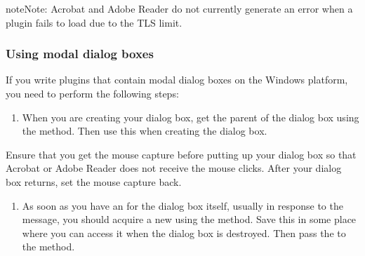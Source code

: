 \documentclass[letterpaper,12pt,english,openany,oneside]{sphinxmanual}
\begin{document}
\begin{sphinxadmonition}{note}{Note:}
Acrobat and Adobe Reader do not currently generate an error when a plugin fails to load due to the TLS limit.
\end{sphinxadmonition}


\subsubsection{Using modal dialog boxes}
\label{\detokenize{Plugins_CreatingSimplePlug:using-modal-dialog-boxes}}
If you write plugins that contain modal dialog boxes on the Windows platform, you need to perform the following steps:
\begin{enumerate}
%
\item {} 
When you are creating your dialog box, get the parent  of the dialog box using the  method. Then use this  when creating the dialog box.

\end{enumerate}

Ensure that you get the mouse capture before putting up your dialog box so that Acrobat or Adobe Reader does not receive the mouse clicks. After your dialog box returns, set the mouse capture back.

\begin{sphinxVerbatim}[commandchars=\\\{\}]
  
   
      
   
     
      
       
\end{sphinxVerbatim}
\begin{enumerate}
%
\setcounter{enumi}{1}
\item {} 
As soon as you have an  for the dialog box itself, usually in response to the  message, you should acquire a new  using the  method. Save this  in some place where you can access it when the dialog box is destroyed. Then pass the  to the  method.

\end{enumerate}
\end{document}
